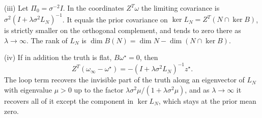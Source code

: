 \documentclass[11pt,letterpaper]{report}
\begin{document}
\textup{(iii)} Let $\Pi_0=\sigma^{-2}I$. In the coordinates $Z^T\omega$ the limiting covariance is $\sigma^2(I+\lambda\sigma^2L_N)^{-1}$. It equals the prior covariance on $\ker L_N=Z^T(N\cap\ker B)$, is strictly smaller on the orthogonal complement, and tends to zero there as $\lambda\to\infty$. The rank of $L_N$ is $\dim B(N)=\dim N-\dim(N\cap\ker B)$.

\textup{(iv)} If in addition the truth is flat, $B\omega^\star=0$, then
\begin{equation}
Z^T(\omega_\infty-\omega^\star)=-(I+\lambda\sigma^2L_N)^{-1}z^\star.
\label{it1:shrinkage}
\end{equation}
The loop term recovers the invisible part of the truth along an eigenvector of $L_N$ with eigenvalue $\mu>0$ up to the factor $\lambda\sigma^2\mu/(1+\lambda\sigma^2\mu)$, and as $\lambda\to\infty$ it recovers all of it except the component in $\ker L_N$, which stays at the prior mean zero.
\end{document}
